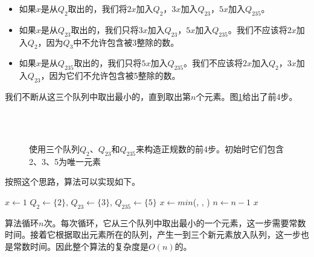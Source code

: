 \documentclass[b5paper]{ctexart}
\begin{document}
\begin{itemize}
\item 如果$x$是从$Q_2$取出的，我们将$2x$加入$Q_2$，$3x$加入$Q_{23}$，$5x$加入$Q_{235}$。
\item 如果$x$是从$Q_{23}$取出的，我们只将$3x$加入$Q_{23}$，$5x$加入$Q_{235}$。我们不应该将$2x$加入$Q_2$，因为$Q_3$中不允许包含被3整除的数。
\item 如果$x$是从$Q_{235}$取出的，我们只将$5x$加入$Q_{235}$。我们不应该将$2x$加入$Q_2$，$3x$加入$Q_{23}$，因为它们不允许包含被5整除的数。
\end{itemize}

我们不断从这三个队列中取出最小的，直到取出第$n$个元素。图\ref{fig:q235}给出了前4步。

\begin{figure}[htbp]
  \centering
   \\
   \\
  \caption{使用三个队列$Q_2$、$Q_{23}$和$Q_{235}$来构造正规数的前4步。初始时它们包含2、3、5为唯一元素}
  \label{fig:q235}
\end{figure}

按照这个思路，算法可以实现如下。

\begin{algorithmic}[1]
  \State $x \gets 1$
  \State $Q_2 \gets \{ 2 \}$, $Q_{23} \gets \{ 3 \}$, $Q_{235} \gets \{ 5 \}$
    \State $x \gets min$(, , )
      \State {}
      \State {}
      \State {}
      \State {}
      \State {}
      \State {}
      \State {}
    \Else
      \State {}
      \State {}
    \EndIf
    \State $n \gets n - 1$
  \EndWhile
  \State \Return $x$
\EndFunction
\end{algorithmic}

算法循环$n$次。每次循环，它从三个队列中取出最小的一个元素，这一步需要常数时间。接着它根据取出元素所在的队列，产生一到三个新元素放入队列，这一步也是常数时间。因此整个算法的复杂度是$O(n)$的。
\end{document}
